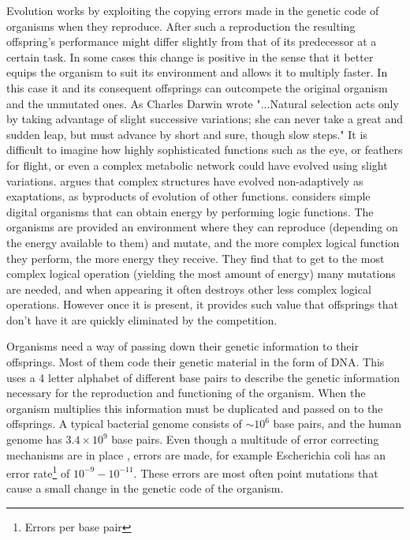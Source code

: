 \documentclass[a4paper,12pt]{article}
\begin{document}
	Evolution works by exploiting the copying errors made in the genetic code of organisms when they reproduce. After such a reproduction the resulting offspring's performance might differ slightly from that of its predecessor at a certain task. In some cases this change is positive in the sense that it better equips the organism to suit its environment and allows it to multiply faster. In this case it and its consequent offsprings can outcompete the original organism and the unmutated ones.  As Charles Darwin wrote "...Natural selection acts only by taking advantage of slight successive variations; she can never take a great and sudden leap, but must advance by short and sure, though slow steps." \cite{darwin} 
	It is difficult to imagine how highly sophisticated functions such as the eye, or feathers for flight, or even a complex metabolic network could have evolved using slight variations. \cite{latent} argues that complex structures have evolved non-adaptively as exaptations, as byproducts of evolution of other functions. \cite{complexfeatures}  considers simple digital organisms that can obtain energy by performing logic functions. The organisms are provided an environment where they can reproduce (depending on the energy available to them) and mutate, and the more complex logical function they perform, the more energy they receive. They find that to get to the most complex logical operation (yielding the most amount of energy) many mutations are needed, and when appearing it often destroys other less complex logical operations. However once it is present, it provides such value that offsprings that don't have it are quickly eliminated by the competition. %
	

	Organisms need a way of passing down their genetic information to their offsprings. 
	Most of them code their genetic material in the form of DNA. This uses a 4 letter alphabet of different base pairs to describe the genetic information necessary for the reproduction and functioning of the organism. When the organism multiplies this information must be duplicated and passed on to the offsprings. A typical bacterial genome consists of $\sim 10^6$ base pairs, and the human genome has $3.4 \times 10^9$ base pairs. Even though a multitude of error correcting mechanisms are in place \cite{dnarepair}, errors are made, for example Escherichia coli has an error rate\footnote{Errors per base pair} of $10^{-9} - 10^{-11}$\cite{ecolierrorrate}. These errors are most often point mutations that cause a small change in the genetic code of the organism.
	
\end{document}
